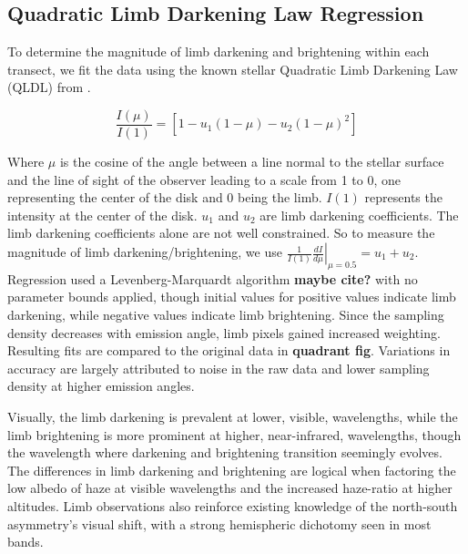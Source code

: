 \documentclass[tighten,linenumbers,twocolumn]{aastex631}
\begin{document}
\subsection{Quadratic Limb Darkening Law Regression}
To determine the magnitude of limb darkening and brightening within each transect, we fit the data using the known stellar Quadratic Limb Darkening Law (QLDL) from \cite{kopal1950limb, brown2001hubble}. 

\begin{equation}
    \frac{I(\mu)}{I(1)} = \left[1 - u_{1}(1 - \mu) - u_{2}(1 - \mu)^2\right]
\end{equation}

Where $\mu$ is the cosine of the angle between a line normal to the stellar surface and the line of sight of the observer leading to a scale from 1 to 0, one representing the center of the disk and 0 being the limb. $I(1)$ represents the intensity at the center of the disk. $u_{1}$ and $u_{2}$ are limb darkening coefficients. The limb darkening coefficients alone are not well constrained. So to measure the magnitude of limb darkening/brightening, we use $\left.\frac{1}{I(1)}\frac{dI}{d\mu}\right|_{\mu=0.5} = u_{1} + u_{2}$. Regression used a Levenberg-Marquardt algorithm \textbf{maybe cite?} 
with no parameter bounds applied, though initial values for positive values indicate limb darkening, while negative values indicate limb brightening. Since the sampling density decreases with emission angle, limb pixels gained increased weighting. Resulting fits are compared to the original data in \textbf{quadrant fig}. Variations in accuracy are largely attributed to noise in the raw data and lower sampling density at higher emission angles.

Visually, the limb darkening is prevalent at lower, visible, wavelengths, while the limb brightening is more prominent at higher, near-infrared, wavelengths, though the wavelength where darkening and brightening transition seemingly evolves. The differences in limb darkening and brightening are logical when factoring the low albedo of haze at visible wavelengths and the increased haze-ratio at higher altitudes. Limb observations also reinforce existing knowledge of the north-south asymmetry's visual shift, with a strong hemispheric dichotomy seen in most bands.
\end{document}
